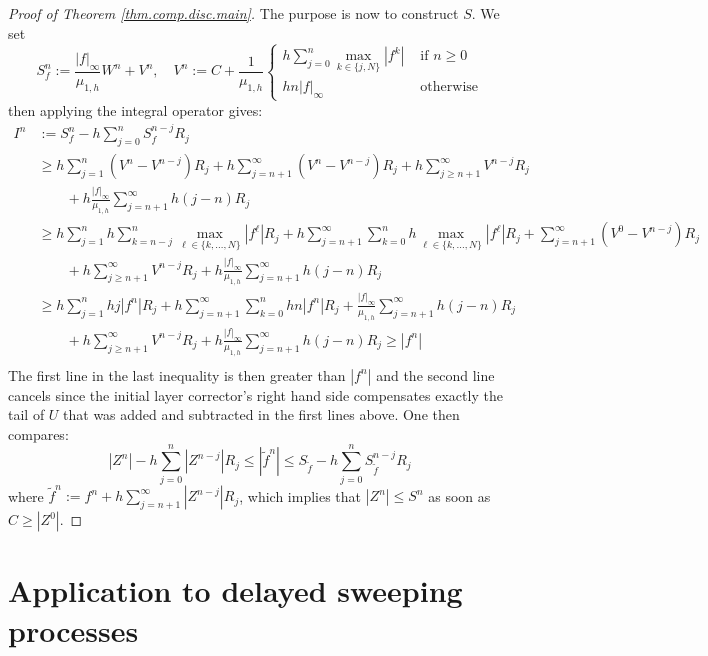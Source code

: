 \documentclass[]{jnsao}
\renewcommand{\tr}{R}
\newcommand{\tf}{\tilde{f}}
\begin{document}
\begin{proof}[Proof of Theorem \ref{thm.comp.disc.main}]
	The purpose is now to construct $S$. We set 
 	$$
 	S^n_f := \frac{|f|_\infty}{\mu_{1,h}} W^n + V^n , \quad V^n:=  C + \frac{1}{\mu_{1,h}}  \begin{cases}
 		h \sum_{j=0}^n \max_{k \in \{ j,N\}} |f^k| & \text{ if } n \geq 0 \\
 		h n |f|_\infty & \text{ otherwise}
 	\end{cases}
 	$$
 	then applying the integral operator gives: 
 	$$
 	\begin{aligned}
 		I^n &:=  S^n_f - h \sum_{j=0}^{n} S^{n-j}_f \tr_j \\
 		& \geq h \sum_{j=1}^n (V^n-V^{n-j})\tr_j 
 				+ h \sum_{j=n+1}^\infty (V^n-V^{n-j})\tr_j  
 				+  h \sum_{j\geq n+1}^\infty V^{n-j} \tr_j \\
 				& \qquad
 				+ h \frac{|f|_\infty}{\mu_{1,h}} \sum_{j=n+1}^\infty h(j-n) \tr_j\\
 		& \geq h \sum_{j=1}^n h \sum_{k=n-j}^n \max_{\ell \in \{ k,\dots,N\}} |f^\ell| \tr_j 
			+ h \sum_{j=n+1}^\infty \sum_{k=0}^n h \max_{\ell \in \{ k,\dots,N\}} |f^\ell| \tr_j
			+ \sum_{j=n+1}^\infty (V^0-V^{n-j} )\tr_j  \\
 		& \qquad+  h \sum_{j\geq n+1}^\infty V^{n-j} \tr_j  + h \frac{|f|_\infty}{\mu_{1,h}} \sum_{j=n+1}^\infty h(j-n) \tr_j\\
 		& \geq h \sum_{j=1}^n h j |f^n| \tr_j + h \sum_{j=n+1}^\infty \sum_{k=0}^n h n |f^n| \tr_j+ \frac{|f|_\infty}{\mu_{1,h}}\sum_{j=n+1}^\infty h({j-n} )\tr_j  \\
 		& \qquad+  h \sum_{j\geq n+1}^\infty V^{n-j} \tr_j  + h \frac{|f|_\infty}{\mu_{1,h}} \sum_{j=n+1}^\infty h(j-n) \tr_j \geq |f^n|\\
 	\end{aligned}
 	$$
 	The first line in the last inequality is then greater than $|f^n|$ and the second line cancels since the initial layer corrector's right hand side compensates exactly the
 	 tail of $U$ that was added and subtracted in the first lines above. One then compares:
 	 $$
 	 \left|Z^n\right|- h \sum_{j=0}^n \left| Z^{n-j} \right| \tr_j 
	 \leq 
	 |\tf^n|  \leq S_{\tf} - h \sum_{j=0}^n S^{n-j}_{\tf} \tr_j
 	 $$
 	where $\tf^n := f^n + h \sum_{j=n+1}^\infty |Z^{n-j}| \tr_j$, which implies that $|Z^n| \leq S^n$ as soon as $C \geq |Z^0|$.
 \end{proof}

\section{Application  to delayed sweeping processes}\label{sec:application}
\end{document}
